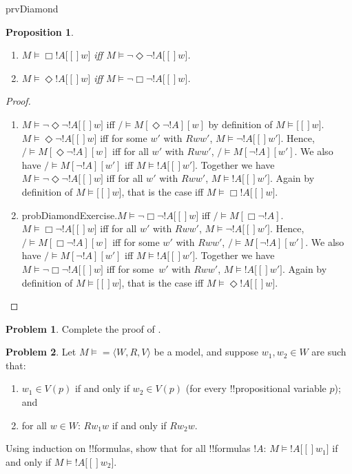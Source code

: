 \documentclass[10pt,a4paper]{article}
\makeatletter
\theoremstyle{plain}
\newtheorem{prop}[thm]{Proposition}
\theoremstyle{definition}
\newtheorem{prob}{Problem}[section]
\theoremstyle{remark}
\newenvironment{probtag}[1]{\begin{prob}}{\end{prob}}
\newcommand*{\ollabel}[1]{\label{#1}}
\newcommand{\olref}{\@ifnextchar[{\olref@i}{\olref@final}}
\def\olref@i[#1]{\@ifnextchar[{\olref@ii}{\olref@final}}
\def\olref@ii[#1]{\@ifnextchar[{\olref@iii}{\olref@final}}
\def\olref@iii[#1]{\olref@final}
\def\olref@final#1{\ref{#1}}
\providecommand{\mSat}[3]{\ensuremath{#1 \models #2[#3]}}
\providecommand{\mModel}[2]{\ensuremath{#1 \models #2}}
\providecommand{\tuple}[1]{\langle #1 \rangle}
\providecommand{\iftag}[1]{#1}
\providecommand{\iftag}{}
\makeatother
\begin{document}
\begin{tagblock}{prvDiamond}
\begin{prop}\ollabel{prop:dual}
  \begin{enumerate}
  \item $\mSat{M}{\Box !A}[w]$ iff $\mSat{M}{\lnot\Diamond\lnot !A}[w]$.
  \item $\mSat{M}{\Diamond !A}[w]$ iff $\mSat{M}{\lnot\Box\lnot !A}[w]$.
  \end{enumerate}
\end{prop}

\begin{proof}
  \begin{enumerate}
    \item $\mSat{M}{\lnot\Diamond\lnot !A}[w]$ iff $\mSat/{M}{\Diamond\lnot
      !A}[w]$ by definition of $\mSat{M}{}[w]$. $\mSat{M}{\Diamond\lnot
      !A}[w]$ iff for some $w'$ with $Rww'$, $\mSat{M}{\lnot
      !A}[w']$. Hence, $\mSat/{M}{\Diamond\lnot !A}[w]$ iff for all
    $w'$ with $Rww'$, $\mSat/{M}{\lnot !A}[w']$. We also have
    $\mSat/{M}{\lnot !A}[w']$ iff $\mSat{M}{!A}[w']$. Together we have
    $\mSat{M}{\lnot\Diamond\lnot !A}[w]$ iff for all $w'$ with $Rww'$,
    $\mSat{M}{!A}[w']$. Again by definition of $\mSat{M}{}[w]$, that
      is the case iff $\mSat{M}{\Box !A}[w]$.
    \item \iftag{probDiamond}{Exercise.}{$\mSat{M}{\lnot\Box\lnot !A}[w]$ iff
      $\mSat/{M}{\Box\lnot !A}$. $\mSat{M}{\Box\lnot !A}[w]$ iff for all
      $w'$ with $Rww'$, $\mSat{M}{\lnot !A}[w']$. Hence,
      $\mSat/{M}{\Box\lnot !A}[w]$ iff for some $w'$ with $Rww'$,
      $\mSat/{M}{\lnot !A}[w']$. We also have $\mSat/{M}{\lnot
        !A}[w']$ iff $\mSat{M}{!A}[w']$. Together we have
      $\mSat{M}{\lnot\Box\lnot !A}[w]$ iff for some~$w'$ with
      $Rww'$, $\mSat{M}{!A}[w']$. Again by definition of
      $\mSat{M}{}[w]$, that is the case iff $\mSat{M}{\Diamond
        !A}[w]$.}
  \end{enumerate}
\end{proof}

\begin{probtag}{probDiamond}
  Complete the proof of \olref[nml][syn][trw]{prop:dual}.
\end{probtag}
\end{tagblock}

\begin{prob}
  Let $\mModel{M} = \tuple{W, R, V}$ be a model, and suppose $w_1, w_2 \in
  W$ are such that:
  \begin{enumerate}
  \item $w_1 \in V(p)$ if and only if $w_2 \in V(p)$ (for every !!{propositional variable} $p$); and
  \item for all $w \in W$: $Rw_1w$ if and only if $Rw_2w$.
  \end{enumerate}
  Using induction on !!{formula}s, show that for all !!{formula}s $!A$:
  $\mSat{M}{!A}[w_1]$ if and only if $\mSat{M}{!A}[w_2]$.
\end{prob}
\end{document}

